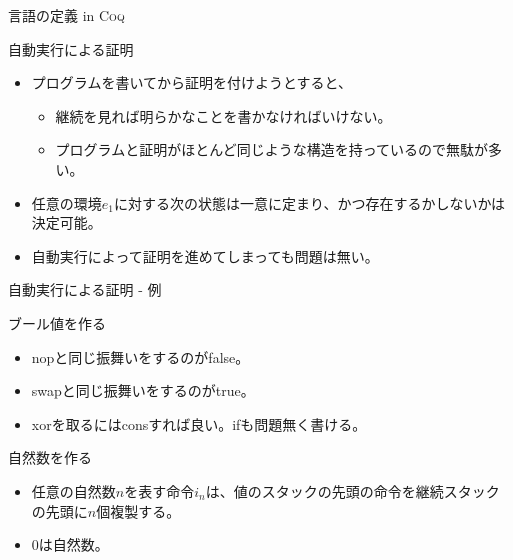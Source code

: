 \documentclass[cjk, 14pt]{beamer}
\newcommand{\Coq}{{\scshape{}Coq}}
\begin{document}
\begin{frame}{言語の定義 in \Coq}

\end{frame}

\begin{frame}{自動実行による証明}

  \begin{itemize}
    \item プログラムを書いてから証明を付けようとすると、
    \begin{itemize}
      \item 継続を見れば明らかなことを書かなければいけない。
      \item プログラムと証明がほとんど同じような構造を持っているので無駄が多い。
    \end{itemize}
    \item 任意の環境$e_1$に対する次の状態は一意に定まり、かつ存在するかしないかは決定可能。
    \item 自動実行によって証明を進めてしまっても問題は無い。
  \end{itemize}

\end{frame}

\begin{frame}{自動実行による証明 - 例}

\end{frame}

\begin{frame}{ブール値を作る}

  \begin{itemize}
    \item nopと同じ振舞いをするのがfalse。
    \item swapと同じ振舞いをするのがtrue。
    \item xorを取るにはconsすれば良い。ifも問題無く書ける。
  \end{itemize}

\end{frame}

\begin{frame}{自然数を作る}

  \begin{itemize}
    \item 任意の自然数$n$を表す命令$i_n$は、値のスタックの先頭の命令を継続スタックの先頭に$n$個複製する。
    \item 0は自然数。
  \end{itemize}

\end{frame}
\end{document}

